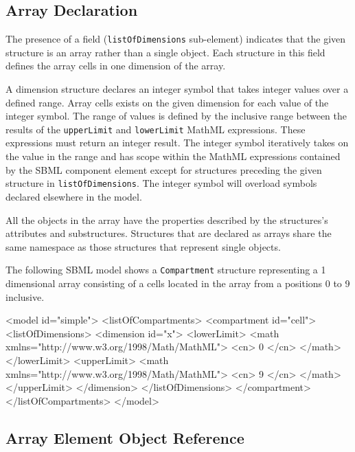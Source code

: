 \documentclass{cekarticle}
\begin{document}
\subsection{Array Declaration}
\label{sec:arraydec}
The presence of a  field
(\texttt{listOfDimensions} sub-element) indicates that the given
structure is an array rather than a single object.  Each  structure in this field defines
the array cells in one dimension of the array.

A dimension structure declares an integer symbol that takes integer values over a defined range.  
Array cells exists on the given dimension for each value of the integer symbol.  The range of values
is defined by the inclusive range between the results of the \texttt{upperLimit} and \texttt{lowerLimit}
MathML expressions.  These expressions must return an integer result.  The integer symbol iteratively takes on the
value in the range and has scope within the MathML expressions contained by the SBML component element
except for  structures preceding the given  structure in \texttt{listOfDimensions}.
The integer symbol will overload symbols declared elsewhere in the model.

All the objects in the
array have the properties described by the structures's
attributes and substructures.
Structures that are declared as arrays share the same namespace
as those structures that represent single objects.

The following SBML model shows a \texttt{Compartment}
structure representing a 1 dimensional array consisting of
a cells located in the array from a positions 0 to 9 inclusive.

\begin{example}
<model id="simple">
    <listOfCompartments>
        <compartment id="cell">
            <listOfDimensions>
                <dimension id="x">
                    <lowerLimit>
                        <math xmlns="http://www.w3.org/1998/Math/MathML">
                            <cn> 0 </cn>
                        </math>
                    </lowerLimit>
                    <upperLimit>
                        <math xmlns="http://www.w3.org/1998/Math/MathML">
                            <cn> 9 </cn>
                        </math>
                    </upperLimit>
                </dimension>
            </listOfDimensions>
        </compartment>
    </listOfCompartments>
</model>
\end{example}

\subsection{Array Element Object Reference}
\end{document}

